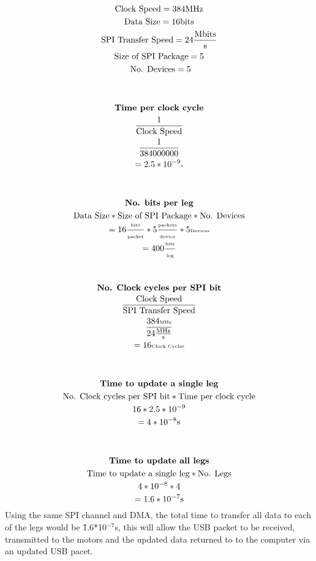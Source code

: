 			\begin{gather*}
			\text{Clock Speed} = 384 \text{MHz}\\
   			\text{Data Size} = 16 \text{bits}\\
   			\text{SPI Transfer Speed} = 24 \frac{\text{Mbits}}{\text{s}}\\
   			\text{Size of SPI Package}= 5\\
   			\text{ No. Devices} = 5\\
   			\\
   			\\
   			\textbf{Time per clock cycle}\\
   			\frac{1}{\text{Clock Speed}}\\
   			\frac{1}{384000000}\\
   			 = 2.5*10^{-9} \tiny{\text{s}}\\
   			 \\
   			 \\
   			\textbf{No. bits per leg}\\
				\text{Data Size} * \text{Size of SPI Package} * \text{No. Devices}\\
				= 16 \tiny{\frac{\text{bits}}{\tiny{\text{packet}}}} * 5\frac{\text{packets}}{\text{device}} * 5\text{Devices} \\
				= 400 \tiny{\frac{\text{bits}}{\text{leg}}}\\
				\\
				\\
				\textbf{No. Clock cycles per SPI bit}\\
				\frac{\text{Clock Speed}}{\text{SPI	Transfer Speed}}\\
				\tiny{\frac{384\text{MHz}}{24\frac{\text{MHz}}{\text{s}}}}\\ 
				 =16\tiny{\text{Clock Cycles}}\\
			\\
			\\
			\textbf{Time to update a single leg}\\
			\text{No. Clock cycles per SPI bit} * \text{Time per clock cycle}\\
			16 * 2.5*10^{-9}\\
			=4*10^{-8}\text{s}\\
			\\
			\\
			\textbf{Time to update all legs}\\
			\text{Time to update a single leg} * \text{No. Legs}\\
			4*10^{-8}* 4\\
		    =1.6*10^{-7}\text{s}\\
			\end{gather*}  
			Using the same SPI channel and DMA, the total time to transfer all data to each of the legs would be \~ 1.6*10$^{-7}$s, this will allow the USB packet to be received, transmitted to the motors and the updated data returned to to the computer via an updated USB pacet. \newline
		

